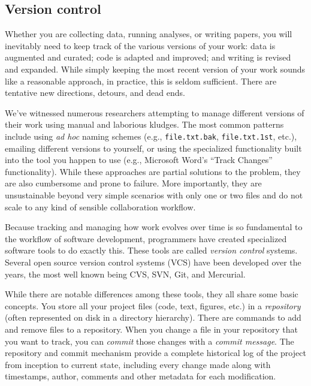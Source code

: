 \documentclass[ChapterTOCs,krantz2]{krantz} %
\theoremstyle{definition}
\begin{document}
\subsection{Version control}

Whether you are collecting data, running analyses, or writing papers,
you will inevitably need to keep track of the various versions of your work:
data is augmented and curated; code is adapted and improved; and writing is
revised and expanded.  While simply keeping the most recent version of your
work sounds like a reasonable approach, in practice, this is seldom sufficient.
There are tentative new directions, detours, and dead ends.

We've witnessed numerous researchers attempting to manage different versions of
their work using manual and laborious kludges. The most common patterns include
using \emph{ad hoc} naming schemes (e.g., \texttt{file.txt.bak},
\texttt{file.txt.1st}, etc.), emailing different versions to yourself, or using
the specialized functionality built into the tool you happen to use (e.g.,
Microsoft Word's ``Track Changes'' functionality).  While these approaches are
partial solutions to the problem, they are also cumbersome and prone to
failure.  More importantly, they are unsustainable beyond very
simple scenarios with only one or two files and do not scale to any kind of
sensible collaboration workflow.

Because tracking and managing how work evolves over time is so fundamental to
the workflow of software development, programmers have created specialized
software tools to do exactly this. These tools are called \emph{version
  control} systems. Several open source version control systems (VCS) have been
developed over the years, the most well known being CVS, SVN, Git, and
Mercurial.

While there are notable differences among these tools, they all share some
basic concepts.  You store all your project files (code,
text, figures, etc.) in a \emph{repository} (often represented on disk in a
directory hierarchy).  There are commands to add and remove files to a
repository.  When you change a file in your repository that you want to track,
you can \emph{commit} those changes with a \emph{commit message}.  The
repository and commit mechanism provide a complete historical log of the
project from inception to current state, including every change made along with
timestamps, author, comments and other metadata for each modification.
\end{document}
